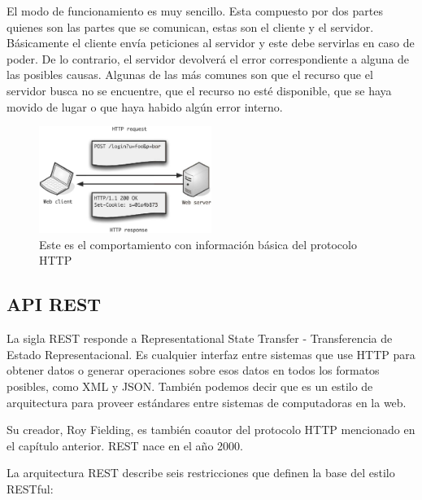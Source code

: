 El modo de funcionamiento es muy sencillo. Esta compuesto por dos partes quienes son 
las partes que se comunican, estas son el cliente y el servidor. Básicamente el cliente
envía peticiones al servidor y este debe servirlas en caso de poder. De lo contrario, 
el servidor devolverá el error correspondiente a alguna de las posibles causas. Algunas 
de las más comunes son que el recurso que el servidor busca no se encuentre, que el 
recurso no esté disponible, que se haya movido de lugar o que haya habido algún error 
interno.

\begin{figure}[htbp!] 
\centering    
\includegraphics[width=0.5\textwidth]{http1}
\caption[HTTP]{Este es el comportamiento con información básica del protocolo HTTP}
\label{fig:http-behavior}
\end{figure}


\subsection{API REST}

La sigla REST responde a Representational State Transfer - Transferencia de Estado
Representacional. Es cualquier interfaz entre sistemas que use HTTP para obtener
datos o generar operaciones sobre esos datos en todos los formatos posibles, como XML y
JSON. También podemos decir que es un estilo de arquitectura para proveer estándares entre
sistemas de computadoras en la web. 

Su creador, Roy Fielding, es también coautor del protocolo HTTP mencionado en el capítulo 
anterior. REST nace en el año 2000.

La arquitectura REST describe seis restricciones que definen la base del estilo 
RESTful:

